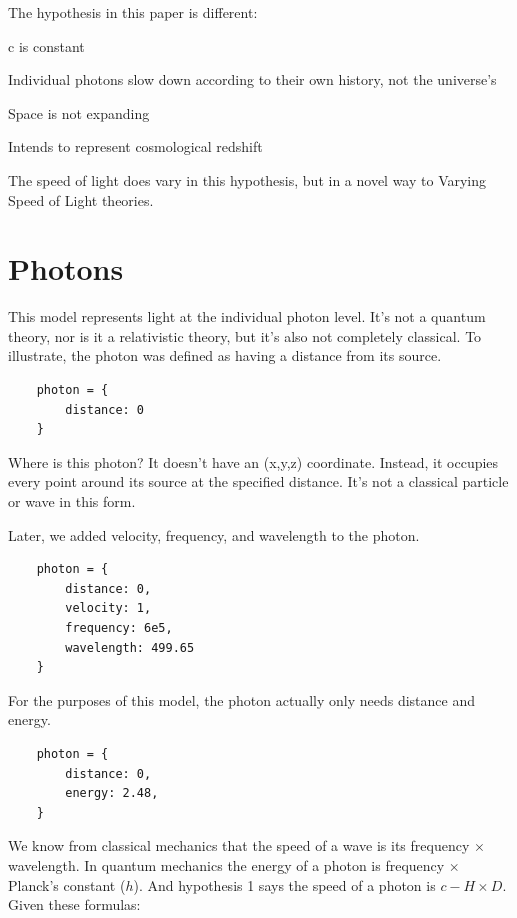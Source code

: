 \documentclass{ws-mpla}
\begin{document}
The hypothesis in this paper is different:

\begin{itemlist}
 \item c is constant 
 \item Individual photons slow down according to their own history, not the universe's 
 \item Space is not expanding 
 \item Intends to represent cosmological redshift 
\end{itemlist}

The speed of light does vary in this hypothesis, but in a novel way to Varying Speed of Light theories.

\section{Photons}

This model represents light at the individual photon level. It's not a quantum theory, nor is it a relativistic theory, but it's also not completely classical. To illustrate, the photon was defined as having a distance from its source.

\begin{verbatim}
    photon = {
        distance: 0
    }
\end{verbatim}

Where is this photon? It doesn't have an (x,y,z) coordinate. Instead, it occupies every point around its source at the specified distance. It's not a classical particle or wave in this form.

Later, we added velocity, frequency, and wavelength to the photon.

\begin{verbatim}
    photon = {
        distance: 0, 
        velocity: 1, 
        frequency: 6e5, 
        wavelength: 499.65
    }
\end{verbatim}

For the purposes of this model, the photon actually only needs distance and energy.

\begin{verbatim}
    photon = {
        distance: 0, 
        energy: 2.48, 
    }
\end{verbatim}

We know from classical mechanics that the speed of a wave is its frequency $\times$ wavelength. In quantum mechanics the energy of a photon is 
frequency $\times$ Planck's constant ($h$). And hypothesis 1 says the speed of a photon is $c - H \times D.$ Given these formulas:
\end{document}
